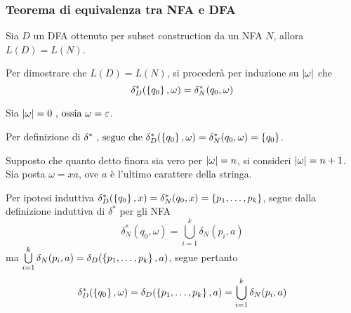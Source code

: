 \documentclass{subfiles}
\begin{document}
\subsubsection{Teorema di equivalenza tra NFA e DFA}
\begin{Theorem}
    Sia \(D\) un DFA ottenuto per subset construction da un NFA \(N\), allora \(L(D) = L(N)\).
    \begin{Proof*}
        Per dimostrare che \(L(D) = L(N)\), si procederà per induzione su \(\abs{\omega}\) che
        \begin{equation}
            \delta_{D}^{*}(\left\{q_{0}\right\}, \omega) = \delta_{N}^{*}(q_{0}, \omega)
        \end{equation}

        \begin{Base*}
            Sia \(\abs{\omega} = 0\text{, ossia} \omega = \varepsilon\).

            \noindent Per definizione di \(\delta^{*} \text{, segue che} \delta_{D}^{*}(\Set{q_{0}}, \omega) = \delta_{N}^{*}(q_{0}, \omega) = \Set{q_{0}}\).
        \end{Base*}
        \begin{Induction*}
            Supposto che quanto detto finora sia vero per \(\abs{\omega} = n\), si consideri \(\abs{\omega} = n + 1\).
            Sia posta \(\omega = xa\), ove \(a\) è l'ultimo carattere della stringa.

            \noindent Per ipotesi induttiva \(\delta_{D}^{*}(\left\{q_{0}\right\}, x) = \delta_{N}^{*}(q_{0}, x) = \left\{p_{1}, \ldots, p_{k}\right\}\),
            segue dalla definizione induttiva di \(\delta^{*}\) per gli NFA
            \begin{equation*}
                \delta_{N}^{*}(q_{0}, \omega) = \bigcup\limits_{i = 1}^{k}{\delta_{N}(p_{i}, a)}
            \end{equation*}
            ma \(\bigcup\limits_{i = 1}^{k}{\delta_{N}(p_{i}, a)} = \delta_{D}(\left\{p_{1}, \ldots, p_{k}\right\}, a)\), segue pertanto
            \begin{equation*}
                \delta_{D}^{*}(\left\{q_{0}\right\}, \omega) = \delta_{D}(\left\{p_{1}, \ldots, p_{k}\right\}, a) = \bigcup\limits_{i = 1}^{k}{\delta_{N}(p_{i}, a)}
            \end{equation*}
        \end{Induction*}
    \end{Proof*}
\end{Theorem}
\end{document}
